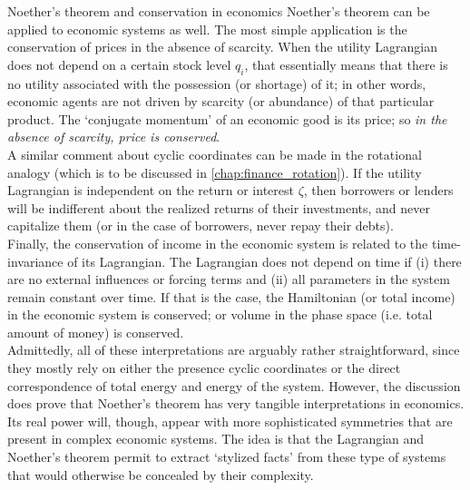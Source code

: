 \begin{econ}{Noether's theorem and conservation in economics}
    Noether's theorem can be applied to economic systems as well. The most simple application is the conservation of prices in the absence of scarcity. When the utility Lagrangian does not depend on a certain stock level $q_i$, that essentially means that there is no utility associated with the possession (or shortage) of it; in other words, economic agents are not driven by scarcity (or abundance) of that particular product. The `conjugate momentum' of an economic good is its price; so \emph{in the absence of scarcity, price is conserved}.\\
    
    A similar comment about cyclic coordinates can be made in the rotational analogy (which is to be discussed in \cref{chap:finance_rotation}). If the utility Lagrangian is independent on the return or interest $\zeta$, then borrowers or lenders will be indifferent about the realized returns of their investments, and never capitalize them (or in the case of borrowers, never repay their debts).\\
    
    Finally, the conservation of income in the economic system is related to the time-invariance of its Lagrangian. The Lagrangian does not depend on time if (i) there are no external influences or forcing terms and (ii) all parameters in the system remain constant over time. If that is the case, the Hamiltonian (or total income) in the economic system is conserved; or volume in the phase space (i.e. total amount of money) is conserved.\\
    
    Admittedly, all of these interpretations are arguably rather straightforward, since they mostly rely on either the presence cyclic coordinates or the direct correspondence of total energy and energy of the system. However, the discussion does prove that Noether's theorem has very tangible interpretations in economics. Its real power will, though, appear with more sophisticated symmetries that are present in complex economic systems. The idea is that the Lagrangian and Noether's theorem permit to extract `stylized facts' from these type of systems that would otherwise be concealed by their complexity. 
\end{econ}

